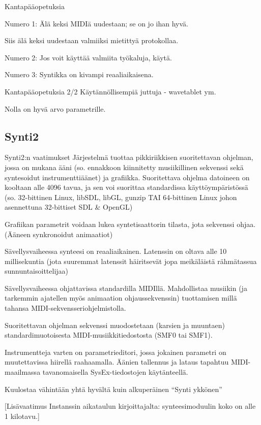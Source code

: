 \documentclass{beamer}
\begin{document}
\begin{frame}{Kantapääopetuksia}

  Numero 1: Älä keksi MIDIä uudestaan; se on jo ihan hyvä.

  Siis älä keksi uudestaan valmiiksi mietittyä protokollaa.

  Numero 2: Jos voit käyttää valmiita työkaluja, käytä.

  Numero 3: Syntikka on kivampi reaaliaikaisena.

\end{frame}

\begin{frame}{Kantapääopetuksia 2/2}
   Käytännöllisempiä juttuja - wavetablet ym.

   Nolla on hyvä arvo parametrille.
\end{frame}

\subsection{Synti2}
\begin{frame}{Synti2:n vaatimukset}
  Järjestelmä tuottaa pikkiriikkisen suoritettavan ohjelman, jossa on
  mukana ääni (so. ennakkoon kiinnitetty musiikillinen sekvenssi sekä
  syntesoidut instrumenttiäänet) ja grafiikka. Suoritettava ohjelma
  datoineen on kooltaan alle 4096 tavua, ja sen voi suorittaa
  standardissa käyttöympäristössä (so. 32-bittinen Linux, libSDL,
  libGL, gunzip TAI 64-bittinen Linux johon asennettuna 32-bittiset
  SDL \& OpenGL)

  Grafiikan parametrit voidaan lukea syntetisaattorin tilasta, jota
  sekvenssi ohjaa. (Ääneen synkronoidut animaatiot)

  Sävellysvaiheessa synteesi on reaaliaikainen. Latenssin on oltava
  alle 10 millisekuntia (jota suuremmat latenssit häiritsevät jopa
  meikäläistä rähmätassua sunnuntaisoittelijaa)

  Sävellysvaiheessa ohjattavissa standardilla MIDIllä. Mahdollistaa
  musiikin (ja tarkemmin ajatellen myös animaation ohjaussekvenssin)
  tuottamisen millä tahansa MIDI-sekvensseriohjelmistolla.

  Suoritettavan ohjelman sekvenssi muodostetaan (karsien ja muuntaen)
  standardimuotoisesta MIDI-musiikkitiedostosta (SMF0 tai SMF1).

  Instrumentteja varten on parametrieditori, jossa jokainen parametri
  on muutettavissa hiirellä raahaamalla. Äänien tallennus ja lataus
  tapahtuu MIDI-maailmassa tavanomaisella SysEx-tiedostojen
  käytänteellä.

  Kuulostaa vähintään yhtä hyvältä kuin alkuperäinen ``Synti ykkönen''

  [Lisävaatimus Instanssin aikataulun kirjoittajalta: synteesimoduulin
    koko on alle 1 kilotavu.]

\end{frame}
\end{document}
